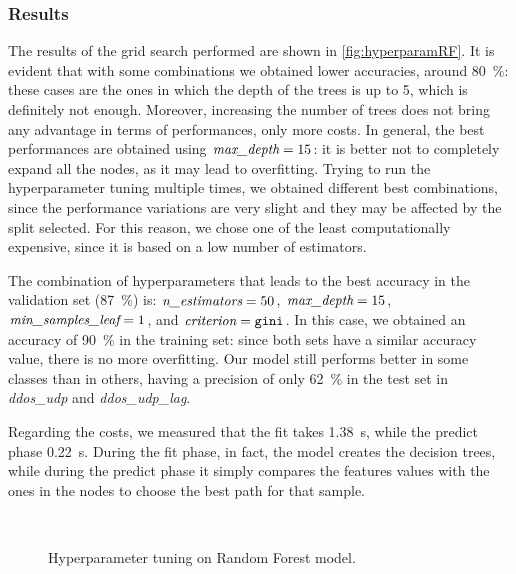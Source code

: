 \documentclass[acmlarge,nonacm]{acmart}
\begin{document}
\subsubsection{Results} 
The results of the grid search performed are shown in \cref{fig:hyperparamRF}. It is evident that with some combinations we obtained lower accuracies, around \SI{80}{\percent}: these cases are the ones in which the depth of the trees is up to 5, which is definitely not enough. Moreover, increasing the number of trees does not bring any advantage in terms of performances, only more costs. In general, the best performances are obtained using $\emph{max\_depth}=15$: it is better not to completely expand all the nodes, as it may lead to overfitting. Trying to run the hyperparameter tuning multiple times, we obtained different best combinations, since the performance variations are very slight and they may be affected by the split selected. For this reason, we chose one of the least computationally expensive, since it is based on a low number of estimators.

The combination of hyperparameters that leads to the best accuracy in the validation set (\SI{87}{\percent}) is: $\emph{n\_estimators}=50$, $\emph{max\_depth}=15$, $\emph{min\_samples\_leaf}=1$, and $\emph{criterion}=\verb|gini|$. In this case, we obtained an accuracy of \SI{90}{\percent} in the training set: since both sets have a similar accuracy value, there is no more overfitting. Our model still performs better in some classes than in others, having a precision of only \SI{62}{\percent} in the test set in \emph{ddos\_udp} and \emph{ddos\_udp\_lag}.

Regarding the costs, we measured that the fit takes \SI{1.38}{\second}, while the predict phase \SI{0.22}{\second}. During the fit phase, in fact, the model creates the decision trees, while during the predict phase it simply compares the features values with the ones in the nodes to choose the best path for that sample.

\begin{figure}
	\centering
     \quad
	 \\
  	\caption{Hyperparameter tuning on Random Forest model.} 
\end{figure}
\end{document}
